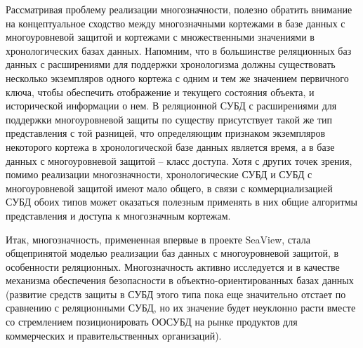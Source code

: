 Рассматривая проблему реализации многозначности, полезно обратить внимание на концептуальное сходство между многозначными кортежами в базе данных с многоуровневой защитой и кортежами с множественными значениями в хронологических базах данных. Напомним, что в большинстве реляционных баз данных с расширениями для поддержки хронологизма должны существовать несколько экземпляров одного кортежа с одним и тем же значением первичного ключа, чтобы обеспечить отображение и текущего состояния объекта, и исторической информации о нем. В реляционной СУБД с расширениями для поддержки многоуровневой защиты по существу присутствует такой же тип представления с той разницей, что определяющим признаком экземпляров некоторого кортежа в хронологической базе данных является время, а в базе данных с многоуровневой защитой -- класс доступа. Хотя с других точек зрения, помимо реализации многозначности, хронологические СУБД и СУБД с многоуровневой защитой имеют мало общего, в связи с коммерциализацией СУБД обоих типов может оказаться полезным применять в них общие алгоритмы представления и доступа к многозначным кортежам.

Итак, многозначность, примененная впервые в проекте SeaView, стала общепринятой моделью реализации баз данных с многоуровневой защитой, в особенности реляционных. Многозначность активно исследуется и в качестве механизма обеспечения безопасности в объектно-ориентированных базах данных (развитие средств защиты в СУБД этого типа пока еще значительно отстает по сравнению с реляционными СУБД, но их значение будет неуклонно расти вместе со стремлением позиционировать ООСУБД на рынке продуктов для коммерческих и правительственных организаций).
